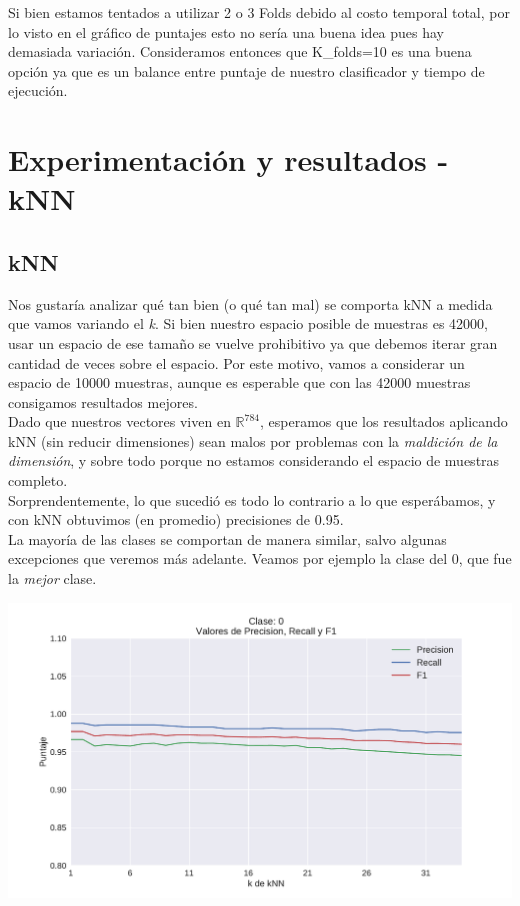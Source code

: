 Si bien estamos tentados a utilizar 2 o 3 Folds debido al costo temporal total, por lo visto en el gráfico de puntajes esto no sería una buena idea pues hay demasiada variación. Consideramos entonces que K_folds=10 es una buena opción ya que es un balance entre puntaje de nuestro clasificador y tiempo de ejecución.


\newpage
\section{Experimentación y resultados - kNN}

\subsection{kNN}

Nos gustaría analizar qué tan bien (o qué tan mal) se comporta kNN a medida que vamos variando el \textit{k}. Si bien nuestro espacio posible de muestras es 42000, usar un espacio de ese tamaño se vuelve prohibitivo ya que debemos iterar gran cantidad de veces sobre el espacio. Por este motivo, vamos a considerar un espacio de 10000 muestras, aunque es esperable que con las 42000 muestras consigamos resultados mejores. \\

Dado que nuestros vectores viven en $\mathbb{R}^{784}$, esperamos que los resultados aplicando kNN (sin reducir dimensiones) sean malos por problemas con la \textit{maldición de la dimensión}, y sobre todo porque no estamos considerando el espacio de muestras completo. \\

Sorprendentemente, lo que sucedió es todo lo contrario a lo que esperábamos, y con kNN obtuvimos (en promedio) precisiones de 0.95. \\

La mayoría de las clases se comportan de manera similar, salvo algunas excepciones que veremos más adelante. Veamos por ejemplo la clase del 0, que fue la \textit{mejor} clase.

{\centering
    \includegraphics[scale=0.55]{informe/imagenes/knn/precisionClase0.pdf} \\
}
$ $\newline

